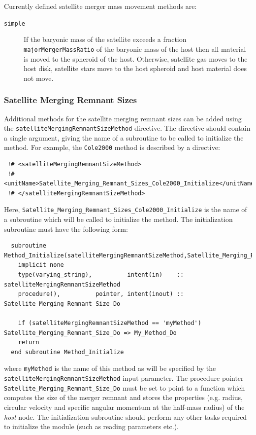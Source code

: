 Currently defined satellite merger mass movement methods are:
\begin{description}
 \item [{\tt simple}] If the baryonic mass of the satellite exceeds a fraction {\tt majorMergerMassRatio} of the baryonic mass of the host then all material is moved to the spheroid of the host. Otherwise, satellite gas moves to the host disk, satellite stars move to the host spheroid and host material does not move.
\end{description}

\subsubsection{Satellite Merging Remnant Sizes}\label{sec:satelliteMergerMassMovementMethod}

Additional methods for the satellite merging remnant sizes can be added using the {\tt satelliteMergingRemnantSizeMethod} directive. The directive should contain a single argument, giving the name of a subroutine to be called to initialize the method. For example, the {\tt Cole2000} method is described by a directive:
\begin{verbatim}
 !# <satelliteMergingRemnantSizeMethod>
 !#  <unitName>Satellite_Merging_Remnant_Sizes_Cole2000_Initialize</unitName>
 !# </satelliteMergingRemnantSizeMethod>
\end{verbatim}
Here, {\tt Satellite\_Merging\_Remnant\_Sizes\_Cole2000\_Initialize} is the name of a subroutine which will be called to initialize the method. The initialization subroutine must have the following form:
\begin{verbatim}
  subroutine Method_Initialize(satelliteMergingRemnantSizeMethod,Satellite_Merging_Remnant_Size_Do)
    implicit none
    type(varying_string),          intent(in)    :: satelliteMergingRemnantSizeMethod
    procedure(),          pointer, intent(inout) :: Satellite_Merging_Remnant_Size_Do
    
    if (satelliteMergingRemnantSizeMethod == 'myMethod') Satellite_Merging_Remnant_Size_Do => My_Method_Do
    return
  end subroutine Method_Initialize
\end{verbatim}
where {\tt myMethod} is the name of this method as will be specified by the {\tt satelliteMergingRemnantSizeMethod} input parameter. The procedure pointer {\tt Satellite\_Merging\_Remnant\_Size\_Do} must be set to point to a function which computes the size of the merger remnant and stores the properties (e.g. radius, circular velocity and specific angular momentum at the half-mass radius) of the \emph{host} node. The initialization subroutine should perform any other tasks required to initialize the module (such as reading parameters etc.).


